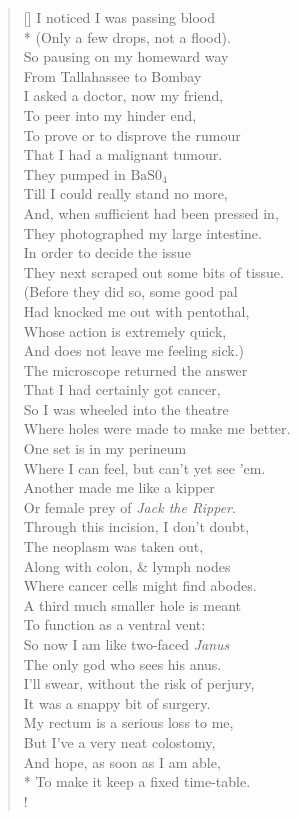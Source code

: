 \documentclass[MAIN]{subfiles}
\begin{document}
\begin{verse}[\versewidth]
I noticed I was passing blood\\*
(Only a few drops, not a flood).\\
So pausing on my homeward way\\
From {\sc Tallahassee} to {\sc Bombay}\\
I asked a doctor, now my friend,\\
To peer into my hinder end,\\
To prove or to disprove the rumour\\
That I had a malignant tumour.\\
They pumped in $\mathrm{BaS0}_4$\\
Till I could really stand no more,\\
And, when sufficient had been pressed in,\\
They photographed my large intestine.\\
In order to decide the issue\\
They next scraped out some bits of tissue.\\
(Before they did so, some good pal\\
Had knocked me out with pentothal,\\
Whose action is extremely quick,\\
And does not leave me feeling sick.)\\
The microscope returned the answer\\
That I had certainly got cancer,\\
So I was wheeled into the theatre\\
Where holes were made to make me better.\\
One set is in my perineum\\
Where I can feel, but can't yet see 'em.\\
Another made me like a kipper\\
Or female prey of \emph{Jack the Ripper}.\\
Through this incision, I don't doubt,\\
The neoplasm was taken out,\\
Along with colon, \& lymph nodes\\
Where cancer cells might find abodes.\\
A third much smaller hole is meant\\
To function as a ventral vent:\\
So now I am like two-faced \emph{Janus}\\
The only god who sees his anus.\\
I'll swear, without the risk of perjury,\\
It was a snappy bit of surgery.\\
My rectum is a serious loss to me,\\
But I've a very neat colostomy,\\
And hope, as soon as I am able,\\*
To make it keep a fixed time-table.\\!


\end{verse}
\end{document}
